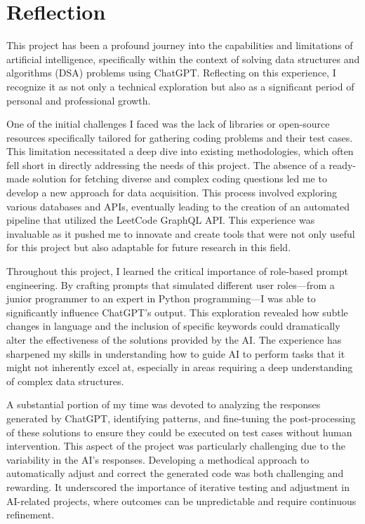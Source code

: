 \chapter{Reflection}
\label{ch:reflection}

This project has been a profound journey into the capabilities and limitations of artificial intelligence, specifically within the context of solving data structures and algorithms (DSA) problems using ChatGPT. Reflecting on this experience, I recognize it as not only a technical exploration but also as a significant period of personal and professional growth.

One of the initial challenges I faced was the lack of libraries or open-source resources specifically tailored for gathering coding problems and their test cases. This limitation necessitated a deep dive into existing methodologies, which often fell short in directly addressing the needs of this project. The absence of a ready-made solution for fetching diverse and complex coding questions led me to develop a new approach for data acquisition. This process involved exploring various databases and APIs, eventually leading to the creation of an automated pipeline that utilized the LeetCode GraphQL API. This experience was invaluable as it pushed me to innovate and create tools that were not only useful for this project but also adaptable for future research in this field.

Throughout this project, I learned the critical importance of role-based prompt engineering. By crafting prompts that simulated different user roles—from a junior programmer to an expert in Python programming—I was able to significantly influence ChatGPT's output. This exploration revealed how subtle changes in language and the inclusion of specific keywords could dramatically alter the effectiveness of the solutions provided by the AI. The experience has sharpened my skills in understanding how to guide AI to perform tasks that it might not inherently excel at, especially in areas requiring a deep understanding of complex data structures.

A substantial portion of my time was devoted to analyzing the responses generated by ChatGPT, identifying patterns, and fine-tuning the post-processing of these solutions to ensure they could be executed on test cases without human intervention. This aspect of the project was particularly challenging due to the variability in the AI's responses. Developing a methodical approach to automatically adjust and correct the generated code was both challenging and rewarding. It underscored the importance of iterative testing and adjustment in AI-related projects, where outcomes can be unpredictable and require continuous refinement.

